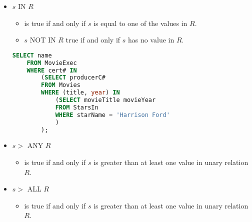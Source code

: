 \documentclass[12pt]{article}
\begin{document}
\begin{enumerate}[1.]
\begin{itemize}
\begin{itemize}
            \bigskip

    \begin{lstlisting}[language=SQL]
    SELECT SupplierName
    FROM Suppliers
    WHERE EXISTS (SELECT ProductName FROM Products WHERE Products.SupplierID = Suppliers.supplierID AND Price = 22);
    \end{lstlisting}

        \end{itemize}

        \item $s$ IN $R$
        \begin{itemize}
            \item is true if and only if $s$ is equal to one of the values in $R$.
            \item $s$ NOT IN $R$ true if and only if $s$ has no value in $R$.
        \end{itemize}

    \begin{lstlisting}[language=SQL]
    SELECT name
    FROM MovieExec
    WHERE cert# IN
        (SELECT producerC#
        FROM Movies
        WHERE (title, year) IN
            (SELECT movieTitle movieYear
            FROM StarsIn
            WHERE starName = 'Harrison Ford'
            )
        );
    \end{lstlisting}

        \item $s >$ ANY $R$
        \begin{itemize}
            \item is true if and only if $s$ is greater than at least one value in
            unary relation $R$.
        \end{itemize}

        \item $s >$ ALL $R$
        \begin{itemize}
            \item is true if and only if $s$ is greater than at least one value in unary
            relation $R$.
        \end{itemize}
    \end{itemize}
\end{enumerate}
\end{document}
